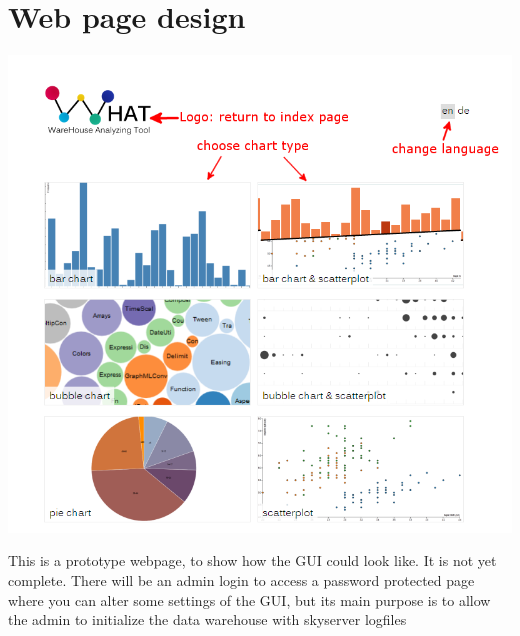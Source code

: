 \section{Web page design}


\begin{center}
\includegraphics[width=0.9\linewidth]{Pictures/WHATHome.png}
\end{center}   

This is a prototype webpage, to show how the GUI could look like. It is not yet complete.
There will be an admin login to access a password protected page where you can alter
some settings of the GUI, but its main purpose is to allow the admin to initialize the data warehouse
with skyserver logfiles %